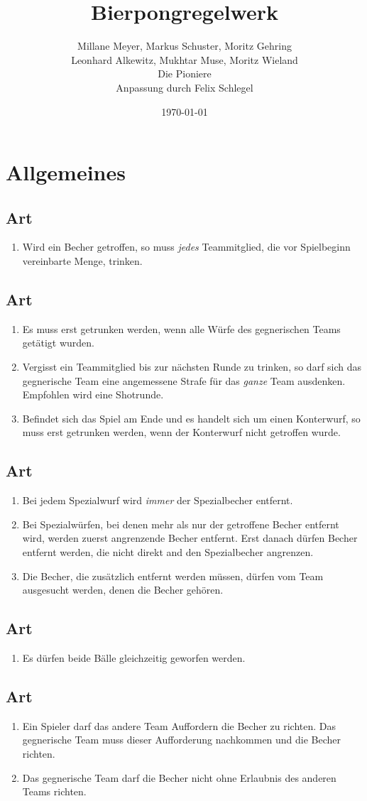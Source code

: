 \documentclass[a4paper,11pt]{scrartcl}
\title{\Huge{Bierpongregelwerk}}
\author{Millane Meyer, Markus Schuster, Moritz Gehring \\Leonhard Alkewitz, Mukhtar Muse, Moritz Wieland \\\tiny{Die Pioniere}\\Anpassung durch Felix Schlegel}
\date{\small{\today}}
\newcommand{\enum}[1]{\begin{enumerate}[label=(\arabic*)]#1\end{enumerate}}
\newcommand{\art}[2]{\subsection*{#1} \enum{#2}}
\newcounter{art}
\begin{document}
\maketitle
\vspace*{-1cm}
\newpage

\section{Allgemeines}
    \art{Art \theart}{
        \item
            Wird ein Becher getroffen, so muss \emph{jedes} Teammitglied, die vor Spielbeginn vereinbarte Menge, trinken.
    }

    \art{Art \theart}{
        \item
            Es muss erst getrunken werden, wenn alle Würfe des gegnerischen Teams getätigt wurden.
        \item
            Vergisst ein Teammitglied bis zur nächsten Runde zu trinken, so darf sich das gegnerische Team eine angemessene Strafe für das \emph{ganze} Team ausdenken. Empfohlen wird eine Shotrunde.
        \item
            Befindet sich das Spiel am Ende und es handelt sich um einen Konterwurf, so muss erst getrunken werden, wenn der Konterwurf nicht getroffen wurde.
    }

    \art{Art \theart}{
        \item
            Bei jedem Spezialwurf wird \emph{immer} der Spezialbecher entfernt.
        \item
            Bei Spezialwürfen, bei denen mehr als nur der getroffene Becher entfernt wird, werden zuerst angrenzende Becher entfernt. Erst danach dürfen Becher entfernt werden, die nicht direkt and den Spezialbecher angrenzen.
        \item
            Die Becher, die zusätzlich entfernt werden müssen, dürfen vom Team ausgesucht werden, denen die Becher gehören.
    }

    \art{Art \theart}{
        \item
            Es dürfen beide Bälle gleichzeitig geworfen werden.
    }

    \art{Art \theart}{
        \item
            Ein Spieler darf das andere Team Auffordern die Becher zu richten. Das gegnerische Team muss dieser Aufforderung nachkommen und die Becher richten.
        \item
            Das gegnerische Team darf die Becher nicht ohne Erlaubnis des anderen Teams richten.
    }
\end{document}
